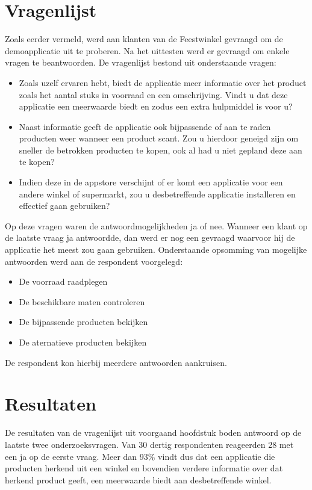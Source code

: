 \section{Vragenlijst}
\label{sec:Vragenlijst}

Zoals eerder vermeld, werd aan klanten van de Feestwinkel gevraagd om de demoapplicatie uit te proberen. Na het uittesten werd er gevraagd om enkele vragen te beantwoorden. De vragenlijst bestond uit onderstaande vragen:
\begin{itemize}
    \item Zoals uzelf ervaren hebt, biedt de applicatie meer informatie over het product zoals het aantal stuks in voorraad en een omschrijving. Vindt u dat deze applicatie een meerwaarde biedt en zodus een extra hulpmiddel is voor u? 
    \item Naast informatie geeft de applicatie ook bijpassende of aan te raden producten weer wanneer een product scant. Zou u hierdoor geneigd zijn om sneller de betrokken producten te kopen, ook al had u niet gepland deze aan te kopen?
    \item Indien deze in de appstore verschijnt of er komt een applicatie voor een andere winkel of supermarkt, zou u desbetreffende applicatie installeren en effectief gaan gebruiken? 
\end{itemize}

  Op deze vragen waren de antwoordmogelijkheden ja of nee. Wanneer een klant op de laatste vraag ja antwoordde, dan werd er nog een gevraagd waarvoor hij de applicatie het meest zou gaan gebruiken. Onderstaande opsomming van mogelijke antwoorden werd aan de respondent voorgelegd:

\begin{itemize}
    \item De voorraad raadplegen
    \item De beschikbare maten controleren
    \item De bijpassende producten bekijken
    \item De aternatieve producten bekijken
\end{itemize}

De respondent kon hierbij meerdere antwoorden aankruisen.

\section{Resultaten}
\label{sec:Resultaten}

De resultaten van de vragenlijst uit voorgaand hoofdstuk boden antwoord op de laatste twee onderzoeksvragen. Van 30 dertig respondenten reageerden 28 met een ja op de eerste vraag. Meer dan 93\% vindt dus dat een applicatie die producten herkend uit een winkel en bovendien verdere informatie over dat herkend product geeft, een meerwaarde biedt aan desbetreffende winkel. 

